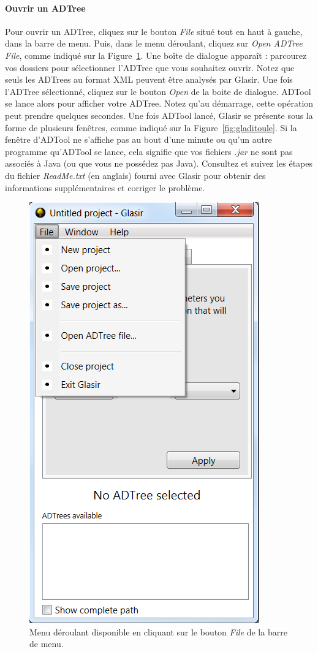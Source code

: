 \paragraph{Ouvrir un ADTree}
Pour ouvrir un ADTree, cliquez sur le bouton \emph{File} situé tout en haut à gauche, dans la barre de menu. Puis, dans le menu déroulant, cliquez sur \emph{Open ADTree File}, comme indiqué sur la {\sc Figure}~\ref{fig:file}. Une boîte de dialogue apparaît : parcourez vos dossiers pour sélectionner l'ADTree que vous souhaitez ouvrir. Notez que seuls les ADTrees au format XML peuvent être analysés par Glasir. Une fois l'ADTree sélectionné, cliquez sur le bouton \emph{Open} de la boite de dialogue. ADTool se lance alors pour afficher votre ADTree. Notez qu'au démarrage, cette opération peut prendre quelques secondes. Une fois ADTool lancé, Glasir se présente sous la forme de plusieurs fenêtres, comme indiqué sur la {\sc Figure}~\ref{fig:gladitoule}. Si la fenêtre d'ADTool ne s'affiche pas au bout d'une minute ou qu'un autre programme qu'ADTool se lance, cela signifie que vos fichiers \emph{.jar} ne sont pas associés à Java (ou que vous ne possédez pas Java). Consultez et suivez les étapes du fichier \emph{ReadMe.txt} (en anglais) fourni avec Glasir pour obtenir des informations supplémentaires et corriger le problème.

	\begin{figure}[H]
        \centering
        \includegraphics[height=0.7\textwidth]{figure/openfile.png}
        \caption{Menu déroulant disponible en cliquant sur le bouton \emph{File} de la barre de menu.}
        \label{fig:file}
    \end{figure}
    
